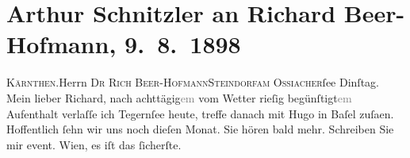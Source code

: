 

         
         \renewcommand{\erwaehntePersonen}{Personen: Richard Beer-Hofmann, Hugo von Hofmannsthal}
         \renewcommand{\erwaehnteOrte}{Orte: Basel, Kärnten, Ossiacher See, Steindorf am Ossiacher See, Tegernsee, Wien}
         \renewcommand{\erwaehnteWerke}{}
               \section[Arthur Schnitzler an Richard Beer-Hofmann, 9. 8. 1898]{ Arthur Schnitzler an Richard Beer-Hofmann, 9. 8. 1898}\nopagebreak{}\rehead{ }\begin{ledgroupsized}[t]{13cm}\normalsize\beginnumbering \toendnotes[C]{\smallbreak\pagebreak[2]} 
\toendnotes[C]{\smallbreak}\pstart{}{\pb}\textsc{Kärnthen}.\pend{}\pstart{}Herrn \textsc{Dr Rich
                     Beer-Hofmann}\pend{}\pstart{}\textsc{Steindorf}\pend{}\pstart{}\textsc{am Ossiacher}ſee\pend{}{\bigskip}\pstart
           \raggedleft{}{\pb}Dinſtag.\pend
           \pstart
           Mein lieber Richard, nach achttägig\textcolor{gray}{em} vom Wetter
               rieſig begünſtigt\textcolor{gray}{em} Aufenthalt verlaſſe ich Tegernſee heute, treffe danach mit Hugo in Baſel zuſa{\geminationm}en. Hoffentlich ſehn wir uns noch dieſen Monat.\pend
           \pstart
           Sie hören bald mehr. Schreiben Sie mir event. Wien, es iſt das ſicherſte.\pend
           \pstart \label{T_L00833_1v}\label{T_L00833_1h}\pend{}
         
         \endnumbering{}\end{ledgroupsized}  \newcommand{\dateiname}{L00833}\newcommand{\titel}{Arthur Schnitzler an Richard Beer-Hofmann, 9. 8. 1898}\newcommand{\editorInnen}{Martin Anton Müller und Gerd-Hermann Susen}
      
